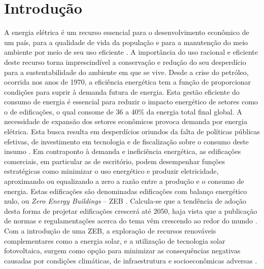 \section{Introdução}
\begin{onehalfspace}
\noindent A energia elétrica é um recurso essencial para o desenvolvimento econômico de um país, para a qualidade de vida da população e para a manutenção do meio ambiente por meio de seu uso eficiente \cite{Fonseca2016}. A importância do uso racional e eficiente deste recurso torna imprescindível a conservação e redução do seu desperdício para a sustentabilidade do ambiente em que se vive.\vspace*{0.3cm} \newline
\noindent Desde a crise do petróleo, ocorrida nos anos de 1970, a eficiência energética tem a função de proporcionar condições para suprir à demanda futura de energia. Esta gestão eficiente do consumo de energia é essencial para reduzir o impacto energético de setores como o de edificações, o qual consome de 36 a 40\% da energia total final global. A necessidade de expansão dos setores econômicos provoca demanda por energia elétrica. Esta busca resulta em desperdícios oriundos da falta de políticas públicas efetivas, de investimento em tecnologia e de fiscalização sobre o consumo deste insumo \cite{InternationalEnergyAgency-IEA2019,InternationalEnergyAgency-IEA2019a, UnitedNationsEnvironmentProgramme-UNEP2019,UnitedNations2017}.\vspace*{0.3cm} \newline
\noindent Em contraponto à demanda e ineficiência energética, as edificações comerciais, em particular as de escritório, podem desempenhar funções estratégicas como minimizar o uso energético e produzir eletricidade, aproximando ou equalizando a zero a razão entre a produção e o consumo de energia. Estas edificações são denominadas edificações com balanço energético nulo, ou \textit{Zero Energy Buildings} – ZEB \cite{Crawley2009,Torcellini2006,Kurnitski2011,Kurnitski2011a,Torcellini2015}.\vspace*{0.3cm} \newline
\noindent Calcula-se que a tendência de adoção desta forma de projetar edificações crescerá até 2050, haja vista que a publicação de normas e regulamentações acerca do tema vêm crescendo ao redor do mundo \cite{UnitedNationsEnvironmentProgramme-UNEP2019}. Com a introdução de uma ZEB, a exploração de recursos renováveis complementares como a energia solar, e a utilização de tecnologia solar fotovoltaica, surgem como opção para minimizar as consequências negativas causadas por condições climáticas, de infraestrutura e socioeconômicas adversas \cite{Pikas2014,Pikas2017}.\vspace*{0.3cm} \newline

\end{onehalfspace}
